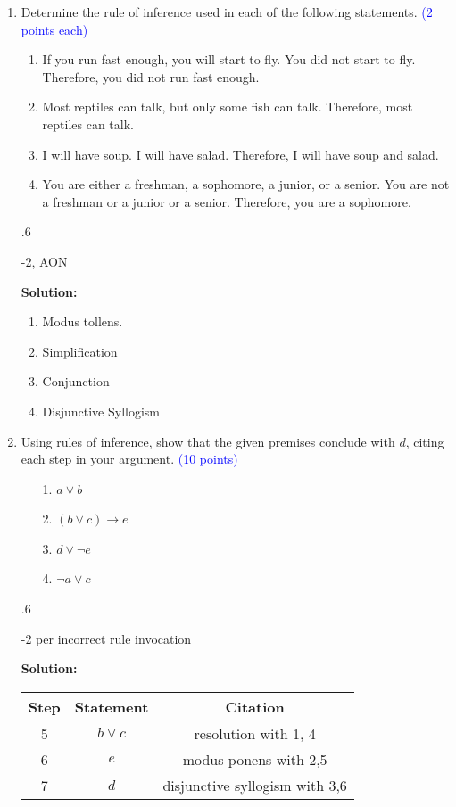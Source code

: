 \documentclass{article}
\newcommand{\pt}[1]{\textcolor{blue}{(#1 points)}}
\newcommand{\pte}[1]{\textcolor{blue}{(#1 points each)}}
\newenvironment{solution}
{
\par
\vspace{2mm}
\color{blue}
\textbf{Solution:}
}
{
\par
}
\newenvironment{rubric}
{
\par
\begin{spacing}{.6}
\begin{itshape}
\color{red}

}
{
\end{itshape}
\end{spacing}
\par
}
\begin{document}
\clearpage
\begin{enumerate}
\item Determine the rule of inference used in each of the following statements. \pte 2
\begin{enumerate}
    \item If you run fast enough, you will start to fly. You did not start to fly. Therefore, you did not run fast enough.
    \item Most reptiles can talk, but only some fish can talk. Therefore, most reptiles can talk.
    \item I will have soup. I will have salad. Therefore, I will have soup and salad.
    \item You are either a freshman, a sophomore, a junior, or a senior. You are not a freshman or a junior or a senior. Therefore, you are a sophomore.
\end{enumerate}

\begin{rubric}
-2, AON
\end{rubric}

\begin{solution}
\begin{enumerate}
    \item Modus tollens.
    \item Simplification
    \item Conjunction
    \item Disjunctive Syllogism
\end{enumerate}
\end{solution}

\item Using rules of inference, show that the given premises conclude with $d$, citing each step in your argument. \pt{10}

\begin{enumerate}
    \item[1.] $a \lor b$
    \item[2.] $(b \lor c) \rightarrow e$
    \item[3.] $d \lor \neg e$
    \item[4.] $\neg a \lor c$
\end{enumerate}

\begin{rubric}
-2 per incorrect rule invocation
\end{rubric}

\begin{solution}
\begin{center}
\begin{tabular}{c|c|c}
    Step & Statement & Citation\\
    \hline
    5 & $b \lor c$ & resolution with 1, 4 \\
    6 & $e$ & modus ponens with 2,5 \\
    7 & $d$ & disjunctive syllogism with 3,6\\
\end{tabular}
\end{center}
\end{solution}


\end{enumerate}
\end{document}
